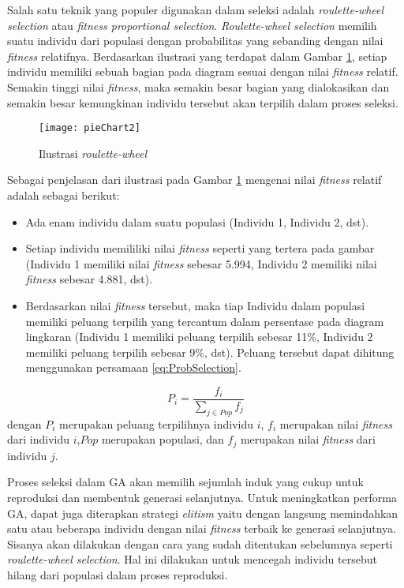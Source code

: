 Salah satu teknik yang populer digunakan dalam seleksi adalah \textit{roulette-wheel selection} atau \textit{fitness proportional selection}. \textit{Roulette-wheel selection} memilih suatu individu dari populasi dengan probabilitas yang sebanding dengan nilai \textit{fitness} relatifnya. Berdasarkan ilustrasi yang terdapat dalam Gambar \ref{fig:pieChart}, setiap individu memiliki sebuah bagian pada diagram sesuai dengan nilai \textit{fitness} relatif. Semakin tinggi nilai \textit{fitness}, maka semakin besar bagian yang dialokasikan dan semakin besar kemungkinan individu tersebut akan terpilih dalam proses seleksi.

\begin{figure}[H]
	\begin{center}
		\texttt{[image: pieChart2]}
		\caption{Ilustrasi \textit{roulette-wheel}}
		\label{fig:pieChart}
	\end{center}
\end{figure}

Sebagai penjelasan dari ilustrasi pada Gambar \ref{fig:pieChart} mengenai nilai \textit{fitness} relatif adalah sebagai berikut:
\begin{itemize}
	\item Ada enam individu dalam suatu populasi (Individu 1, Individu 2, dst).
	\item Setiap individu memililiki nilai \textit{fitness} seperti yang tertera pada gambar (Individu 1 memiliki nilai \textit{fitness} sebesar 5.994, Individu 2 memiliki nilai \textit{fitness} sebesar 4.881, dst).
	\item Berdasarkan nilai \textit{fitness} tersebut, maka tiap Individu dalam populasi memiliki peluang terpilih yang tercantum dalam persentase pada diagram lingkaran (Individu 1 memiliki peluang terpilih sebesar 11\%, Individu 2 memiliki peluang terpilih sebesar 9\%, dst). Peluang tersebut dapat dihitung menggunakan persamaan \ref{eq:ProbSelection}.
\end{itemize}

\begin{equation}
	\label{eq:ProbSelection}
	P_i=\frac{f_i}{\sum_{j \in Pop} f_j}
\end{equation}
dengan $P_i$ merupakan peluang terpilihnya individu $i$, $f_i$ merupakan nilai \textit{fitness} dari individu $i$,$Pop$ merupakan populasi, dan $f_j$ merupakan nilai \textit{fitness} dari individu $j$.

Proses seleksi dalam GA akan memilih sejumlah induk yang cukup untuk reproduksi dan membentuk generasi selanjutnya. Untuk meningkatkan performa GA, dapat juga diterapkan strategi \textit{elitism} yaitu dengan langsung memindahkan satu atau beberapa individu dengan nilai \textit{fitness} terbaik ke generasi selanjutnya. Sisanya akan dilakukan dengan cara yang sudah ditentukan sebelumnya seperti \textit{roulette-wheel selection}. Hal ini dilakukan untuk mencegah individu tersebut hilang dari populasi dalam proses reproduksi.

